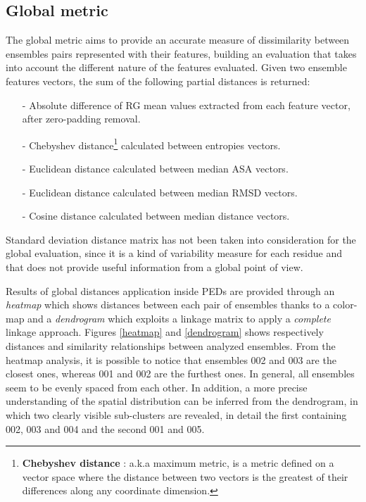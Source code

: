 \subsection{Global metric}
The global metric aims to provide an accurate measure of dissimilarity between ensembles pairs represented with their features, building an evaluation that takes into account the different nature of the features evaluated. Given two ensemble features vectors, the sum of the following partial distances is returned:
\begin{itemize}
\item[-] Absolute difference of RG mean values extracted from each feature vector, after zero-padding removal.
\item[-] Chebyshev distance\footnote{\textbf{Chebyshev distance} : a.k.a maximum metric, is a metric defined on a vector space where the distance between two vectors is the greatest of their differences along any coordinate dimension.} calculated between entropies vectors.
\item[-] Euclidean distance calculated between median ASA vectors.
\item[-] Euclidean distance calculated between median RMSD vectors.
\item[-] Cosine distance calculated between median distance vectors.
\end{itemize}

Standard deviation distance matrix has not been taken into consideration for the global evaluation, since it is a kind of variability measure for each residue and that does not provide useful information from a global point of view.

Results of global distances application inside PEDs are provided through an \emph{heatmap} which shows distances between each pair of ensembles thanks to a color-map and a \emph{dendrogram} which exploits a linkage matrix to apply a \emph{complete} linkage approach.
Figures \ref{heatmap} and \ref{dendrogram} shows respectively distances and similarity relationships between analyzed ensembles. From the heatmap analysis, it is possible to notice that ensembles 002 and 003 are the closest ones, whereas 001 and 002 are the furthest ones. In general, all ensembles seem to be evenly spaced from each other. In addition, a more precise understanding of the spatial distribution can be inferred from the dendrogram, in which two clearly visible sub-clusters are revealed, in detail the first containing 002, 003 and 004 and the second 001 and 005.

